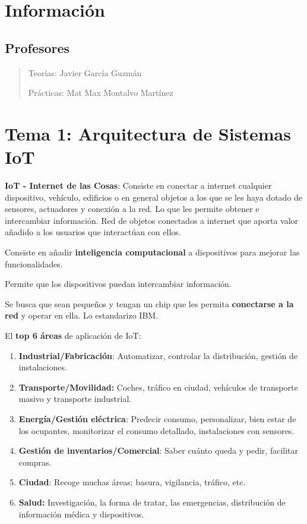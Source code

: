 \documentclass[12pt, twoside, openright]{report} %
\begin{document}



\chapter{Información}
\section{Profesores}

\begin{quote}
	Teorías: Javier García Guzmán

	Prácticas: Mat Max Montalvo Martínez
\end{quote}

\chapter{Tema 1: Arquitectura de Sistemas
  IoT}


\textbf{IoT - Internet de las Cosas}: Consiste en conectar a internet
cualquier dispositivo, vehículo, edificios o en general objetos a los
que se les haya dotado de sensores, actuadores y conexión a la red. Lo
que les permite obtener e intercambiar información. Red de objetos
conectados a internet que aporta valor añadido a los usuarios que
interactúan con ellos.

Consiste en añadir \textbf{inteligencia computacional} a dispositivos
para mejorar las funcionalidades.

Permite que los dispositivos puedan intercambiar información.

Se busca que sean pequeños y tengan un chip que les permita
\textbf{conectarse a la red} y operar en ella. Lo estandarizo IBM.

El \textbf{top 6 áreas} de aplicación de IoT:

\begin{enumerate}
	\def\labelenumi{\arabic{enumi}.}
	\item \textbf{Industrial/Fabricación}: Automatizar, controlar la
	      distribución, gestión de instalaciones.
	\item \textbf{Transporte/Movilidad:} Coches, tráfico en ciudad, vehículos de
	      transporte masivo y transporte industrial.
	\item \textbf{Energía/Gestión eléctrica}: Predecir consumo, personalizar,
	      bien estar de los ocupantes, monitorizar el consumo detallado,
	      instalaciones con sensores.
	\item \textbf{Gestión de inventarios/Comercial}: Saber cuánto queda y pedir,
	      facilitar compras.
	\item \textbf{Ciudad}: Recoge muchas áreas; basura, vigilancia, tráfico,
	      etc.
	\item \textbf{Salud:} Investigación, la forma de tratar, las emergencias,
	      distribución de información médica y dispositivos.
\end{enumerate}
\end{document}
